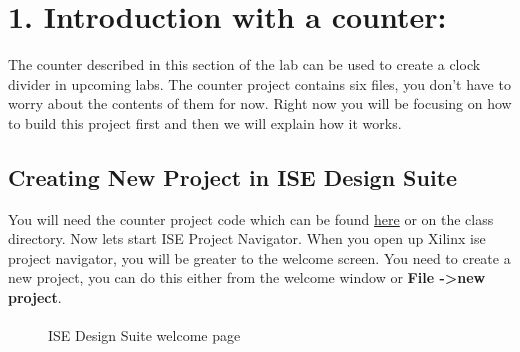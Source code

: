 \documentclass{article}
\begin{document}
\newpage
\section{1. Introduction with a counter:}
The counter described in this section of the lab can be used to create a clock divider in upcoming labs. The counter project contains six files, you don't have to worry about the contents of them for now. Right now you will be focusing on how to build this project first and then we will explain how it works.

\subsection{Creating New Project in ISE Design Suite}

You will need the counter project code which can be found \href{https://github.com/reiuiji/ECE368-Lab/tree/master/Lab%201/Counter}{here} or on the class directory.
Now lets start ISE Project Navigator. When you open up Xilinx ise project navigator, you will be greater to the welcome screen. You need to create a new project, you can do this either from the welcome window or \textbf{File -\textgreater new project}.

\begin{figure}[!h]
  \centering
  \caption{ISE\textsuperscript{\textregistered} Design Suite welcome page}
\end{figure}
\end{document}
